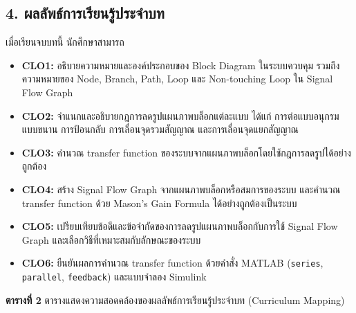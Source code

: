 \subsection{4. ผลลัพธ์การเรียนรู้ประจำบท}

เมื่อเรียนจบบทนี้ นักศึกษาสามารถ

\begin{itemize}
    \item \textbf{CLO1:} อธิบายความหมายและองค์ประกอบของ Block Diagram ในระบบควบคุม รวมถึงความหมายของ Node, Branch, Path, Loop และ Non-touching Loop ใน Signal Flow Graph
    \item \textbf{CLO2:} จำแนกและอธิบายกฎการลดรูปแผนภาพบล็อกแต่ละแบบ ได้แก่ การต่อแบบอนุกรม แบบขนาน การป้อนกลับ การเลื่อนจุดรวมสัญญาณ และการเลื่อนจุดแยกสัญญาณ
    \item \textbf{CLO3:} คำนวณ transfer function ของระบบจากแผนภาพบล็อกโดยใช้กฎการลดรูปได้อย่างถูกต้อง
    \item \textbf{CLO4:} สร้าง Signal Flow Graph จากแผนภาพบล็อกหรือสมการของระบบ และคำนวณ transfer function ด้วย Mason's Gain Formula ได้อย่างถูกต้องเป็นระบบ
    \item \textbf{CLO5:} เปรียบเทียบข้อดีและข้อจำกัดของการลดรูปแผนภาพบล็อกกับการใช้ Signal Flow Graph และเลือกวิธีที่เหมาะสมกับลักษณะของระบบ
    \item \textbf{CLO6:} ยืนยันผลการคำนวณ transfer function ด้วยคำสั่ง MATLAB (\texttt{series}, \texttt{parallel}, \texttt{feedback}) และแบบจำลอง Simulink
\end{itemize}

\textbf{ตารางที่ 2} ตารางแสดงความสอดคล้องของผลลัพธ์การเรียนรู้ประจำบท (Curriculum Mapping)

